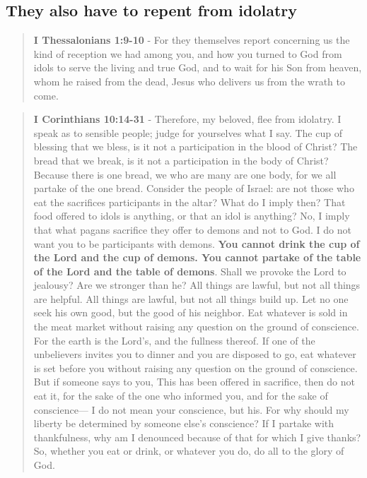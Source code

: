 \documentclass[11pt]{article}
\begin{document}
\subsection{They also have to repent from idolatry}
\label{sec:org7cba0a4}
\begin{quote}
\textbf{I Thessalonians 1:9-10} - For they themselves report concerning us the kind of reception we had among you, and how you turned to God from idols to serve the living and true God, and to wait for his Son from heaven, whom he raised from the dead, Jesus who delivers us from the wrath to come.
\end{quote}

\begin{quote}
\textbf{I Corinthians 10:14-31} - Therefore, my beloved, flee from idolatry. I speak as to sensible people; judge for yourselves what I say. The cup of blessing that we bless, is it not a participation in the blood of Christ? The bread that we break, is it not a participation in the body of Christ? Because there is one bread, we who are many are one body, for we all partake of the one bread. Consider the people of Israel: are not those who eat the sacrifices participants in the altar? What do I imply then? That food offered to idols is anything, or that an idol is anything? No, I imply that what pagans sacrifice they offer to demons and not to God. I do not want you to be participants with demons. \textbf{You cannot drink the cup of the Lord and the cup of demons. You cannot partake of the table of the Lord and the table of demons}. Shall we provoke the Lord to jealousy? Are we stronger than he? All things are lawful, but not all things are helpful. All things are lawful, but not all things build up. Let no one seek his own good, but the good of his neighbor. Eat whatever is sold in the meat market without raising any question on the ground of conscience. For the earth is the Lord's, and the fullness thereof. If one of the unbelievers invites you to dinner and you are disposed to go, eat whatever is set before you without raising any question on the ground of conscience. But if someone says to you, This has been offered in sacrifice, then do not eat it, for the sake of the one who informed you, and for the sake of conscience— I do not mean your conscience, but his. For why should my liberty be determined by someone else's conscience? If I partake with thankfulness, why am I denounced because of that for which I give thanks? So, whether you eat or drink, or whatever you do, do all to the glory of God.
\end{quote}
\end{document}
